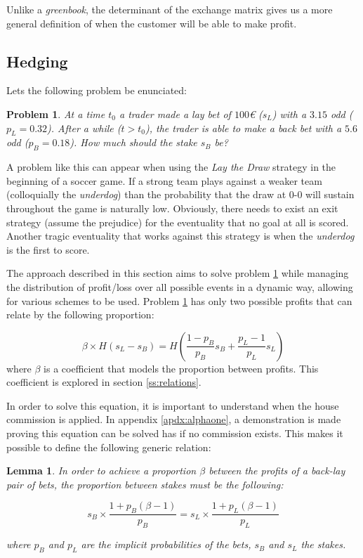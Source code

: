 \documentclass{article}
\newtheorem{problem}{Problem}
\newtheorem{lemma}{Lemma}
\begin{document}
Unlike a \emph{greenbook}, the determinant of the exchange matrix 
gives us a more general definition of when the customer will be able 
to make profit.

\subsection{Hedging}
Lets the following problem be enunciated:

\begin{problem}
\label{prb:backLayProblem}
At a time $t_{0}$ a trader made a lay bet of $100$\euro\: ($s_{L}$) 
with a $3.15$ odd ($p_{L}=0.32$). After a while ($t>t_{0}$), the 
trader is able to make a back bet with a $5.6$ odd ($p_{B}=0.18$). 
How much should the stake $s_{B}$ be?
\end{problem}

A problem like this can appear when using the \emph{Lay the Draw} 
strategy in the beginning of a soccer game. If a strong team plays 
against a weaker team (colloquially the \emph{underdog}) than the 
probability that the draw at 0-0 will sustain throughout the game is 
naturally low. Obviously, there needs to exist an exit strategy 
(assume the prejudice) for the eventuality that no goal at all is 
scored. Another tragic eventuality that works against this strategy 
is when the \emph{underdog} is the first to score.

The approach described in this section aims to solve problem
\ref{prb:backLayProblem} while managing the distribution of 
profit/loss over all possible events in a dynamic way, allowing for 
various schemes to be used. Problem \ref{prb:backLayProblem} has 
only two possible profits that can relate by the following proportion:

\begin{equation}
\label{eq:tradingeq}
    \beta \times H\left( s_{L}-s_{B}\right) = H\left(
         \frac{1-p_{B}}{p_{B}}s_{B} + \frac{p_{L}-1}{p_{L}}s_{L}\right)
\end{equation}
where $\beta$ is a coefficient that models the proportion between 
profits. This coefficient is explored in section \ref{ss:relations}.

In order to solve this equation, it is important to understand when 
the house commission is applied. In appendix \ref{apdx:alphaone}, a 
demonstration is made proving this equation can be solved has if no 
commission exists. This makes it possible to define the following 
generic relation:

\begin{lemma}
    In order to achieve a proportion $\beta$ between the profits of 
    a back-lay pair of bets, the proportion between stakes must be 
    the following:
    
    \begin{equation}
    \label{eq:genericTradingRelation}
        s_{B} \times \frac{1+p_{B}(\beta -1)}{p_{B}} = s_{L} \times
                                        \frac{1+p_{L}(\beta -1)}{p_{L}} 
    \end{equation}
    
    where $p_{B}$ and $p_{L}$ are the implicit probabilities of the 
    bets, $s_{B}$ and $s_{L}$ the stakes.
\end{lemma}
\end{document}
